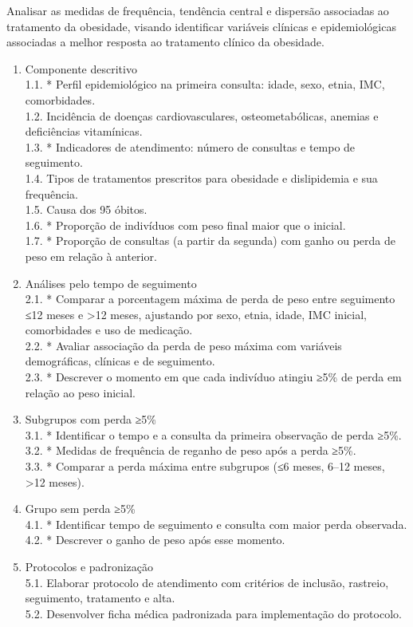 \documentclass[
]{article}
\begin{document}
Analisar as medidas de frequência, tendência central e dispersão
associadas ao tratamento da obesidade, visando identificar variáveis
clínicas e epidemiológicas associadas a melhor resposta ao tratamento
clínico da obesidade.

\begin{enumerate}
\def\labelenumi{\arabic{enumi}.}
\item
  Componente descritivo\\
  1.1. * Perfil epidemiológico na primeira consulta: idade, sexo, etnia,
  IMC, comorbidades.\\
  1.2. Incidência de doenças cardiovasculares, osteometabólicas, anemias
  e deficiências vitamínicas.\\
  1.3. * Indicadores de atendimento: número de consultas e tempo de
  seguimento.\\
  1.4. Tipos de tratamentos prescritos para obesidade e dislipidemia e
  sua frequência.\\
  1.5. Causa dos 95 óbitos.\\
  1.6. * Proporção de indivíduos com peso final maior que o inicial.\\
  1.7. * Proporção de consultas (a partir da segunda) com ganho ou perda
  de peso em relação à anterior.
\item
  Análises pelo tempo de seguimento\\
  2.1. * Comparar a porcentagem máxima de perda de peso entre seguimento
  ≤12 meses e \textgreater12 meses, ajustando por sexo, etnia, idade,
  IMC inicial, comorbidades e uso de medicação.\\
  2.2. * Avaliar associação da perda de peso máxima com variáveis
  demográficas, clínicas e de seguimento.\\
  2.3. * Descrever o momento em que cada indivíduo atingiu ≥5\% de perda
  em relação ao peso inicial.
\item
  Subgrupos com perda ≥5\%\\
  3.1. * Identificar o tempo e a consulta da primeira observação de
  perda ≥5\%.\\
  3.2. * Medidas de frequência de reganho de peso após a perda ≥5\%.\\
  3.3. * Comparar a perda máxima entre subgrupos (≤6 meses, 6--12 meses,
  \textgreater12 meses).
\item
  Grupo sem perda ≥5\%\\
  4.1. * Identificar tempo de seguimento e consulta com maior perda
  observada.\\
  4.2. * Descrever o ganho de peso após esse momento.
\item
  Protocolos e padronização\\
  5.1. Elaborar protocolo de atendimento com critérios de inclusão,
  rastreio, seguimento, tratamento e alta.\\
  5.2. Desenvolver ficha médica padronizada para implementação do
  protocolo.
\end{enumerate}
\end{document}
